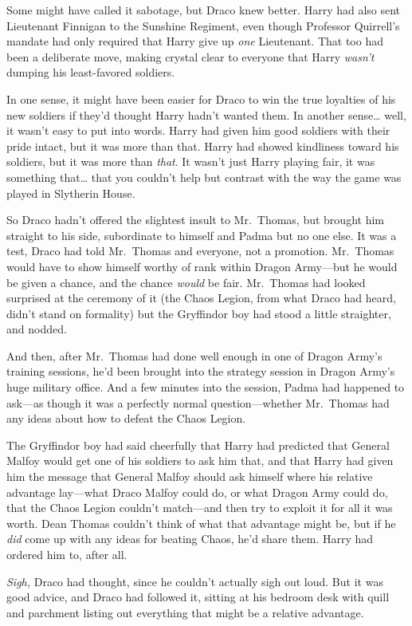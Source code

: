 Some might have called it sabotage, but Draco knew better. Harry had also sent 
Lieutenant Finnigan to the Sunshine Regiment, even though Professor Quirrell's 
mandate had only required that Harry give up \emph{one} Lieutenant. That too 
had been a deliberate move, making crystal clear to everyone that Harry 
\emph{wasn't} dumping his least-favored soldiers.

In one sense, it might have been easier for Draco to win the true loyalties of 
his new soldiers if they'd thought Harry hadn't wanted them. In another 
sense{\ldots} well, it wasn't easy to put into words. Harry had given him good 
soldiers with their pride intact, but it was more than that. Harry had showed 
kindliness toward his soldiers, but it was more than \emph{that}. It wasn't 
just Harry playing fair, it was something that{\ldots} that you couldn't help 
but contrast with the way the game was played in Slytherin House.

So Draco hadn't offered the slightest insult to Mr.~Thomas, but brought him 
straight to his side, subordinate to himself and Padma but no one else. It was 
a test, Draco had told Mr.~Thomas and everyone, not a promotion. Mr.~Thomas 
would have to show himself worthy of rank within Dragon Army---but he would be 
given a chance, and the chance \emph{would} be fair. Mr.~Thomas had looked 
surprised at the ceremony of it (the Chaos Legion, from what Draco had heard, 
didn't stand on formality) but the Gryffindor boy had stood a little 
straighter, and nodded.

And then, after Mr.~Thomas had done well enough in one of Dragon Army's 
training sessions, he'd been brought into the strategy session in Dragon Army's 
huge military office. And a few minutes into the session, Padma had happened to 
ask---as though it was a perfectly normal question---whether Mr.~Thomas had any 
ideas about how to defeat the Chaos Legion.

The Gryffindor boy had said cheerfully that Harry had predicted that General 
Malfoy would get one of his soldiers to ask him that, and that Harry had given 
him the message that General Malfoy should ask himself where his relative 
advantage lay---what Draco Malfoy could do, or what Dragon Army could do, that 
the Chaos Legion couldn't match---and then try to exploit it for all it was 
worth. Dean Thomas couldn't think of what that advantage might be, but if he 
\emph{did} come up with any ideas for beating Chaos, he'd share them. Harry had 
ordered him to, after all.

\emph{Sigh,} Draco had thought, since he couldn't actually sigh out loud. But 
it was good advice, and Draco had followed it, sitting at his bedroom desk with 
quill and parchment listing out everything that might be a relative advantage.

